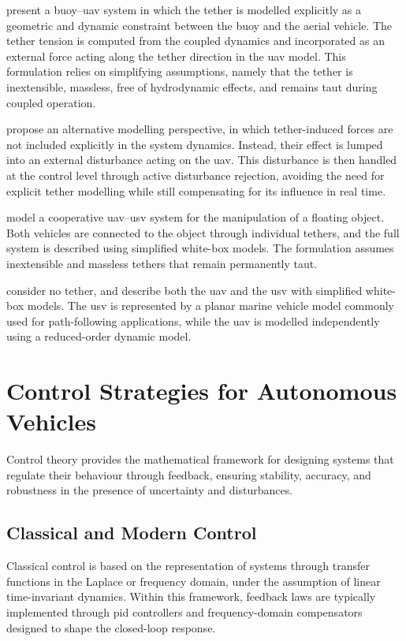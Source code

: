 \citet{kouraniMarineLocomotionTethered2021} present a buoy--\gls{uav} system in which the tether is modelled explicitly as a geometric and dynamic constraint between the buoy and the aerial vehicle. The tether tension is computed from the coupled dynamics and incorporated as an external force acting along the tether direction in the \gls{uav} model. This formulation relies on simplifying assumptions, namely that the tether is inextensible, massless, free of hydrodynamic effects, and remains taut during coupled operation.

\citet{yuReducedComplexityActiveDisturbance2023} propose an alternative modelling perspective, in which tether-induced forces are not included explicitly in the system dynamics. Instead, their effect is lumped into an external disturbance acting on the \gls{uav}. This disturbance is then handled at the control level through active disturbance rejection, avoiding the need for explicit tether modelling while still compensating for its influence in real time.

\citet{novakCollaborativeObjectManipulation2024} model a cooperative \gls{uav}--\gls{usv} system for the manipulation of a floating object. Both vehicles are connected to the object through individual tethers, and the full system is described using simplified white-box models. The formulation assumes inextensible and massless tethers that remain permanently taut.

\citet{zhangCooperativeControlFramework2025} consider no tether, and describe both the \gls{uav} and the \gls{usv} with simplified white-box models. The \gls{usv} is represented by a planar marine vehicle model commonly used for path-following applications, while the \gls{uav} is modelled independently using a reduced-order dynamic model.

\section{Control Strategies for Autonomous Vehicles}
\label{sec:sota_control}

Control theory provides the mathematical framework for designing systems that regulate their behaviour through feedback, ensuring stability, accuracy, and robustness in the presence of uncertainty and disturbances.

\subsection{Classical and Modern Control}
\label{subsec:sota_classical_modern}
Classical control is based on the representation of systems through transfer functions in the Laplace or frequency domain, under the assumption of linear time-invariant dynamics. Within this framework, feedback laws are typically implemented through \gls{pid} controllers and frequency-domain compensators designed to shape the closed-loop response. 

